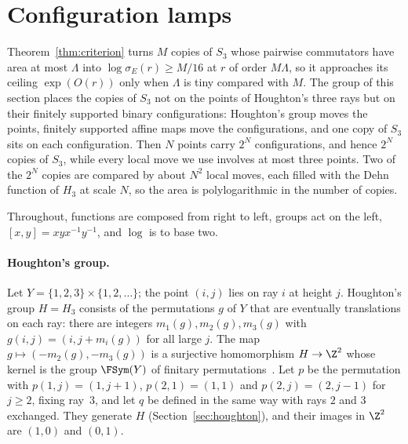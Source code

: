 \section{Configuration lamps}\label{sec:group}

Theorem~\ref{thm:criterion} turns $M$ copies of $S_3$ whose pairwise commutators have area at most $\Lambda$ into $\log\sigma_E(r)\ge M/16$ at
$r$ of order $M\Lambda$, so it approaches its ceiling $\exp(O(r))$ only when $\Lambda$ is tiny compared with $M$. The group of this section places
the copies of $S_3$ not on the points of Houghton's three rays but on their finitely supported binary configurations: Houghton's group moves the
points, finitely supported affine maps move the configurations, and one copy of $S_3$ sits on each configuration. Then $N$ points carry $2^N$
configurations, and hence $2^N$ copies of $S_3$, while every local move we use involves at most three points. Two of the $2^N$ copies are
compared by about $N^2$ local moves, each filled with the Dehn function of $H_3$ at scale $N$, so the area is polylogarithmic in the number of
copies.

Throughout, functions are composed from right to left, groups act on the left, $[x,y]=xyx^{-1}y^{-1}$, and $\log$ is to base two.

\paragraph{Houghton's group.} Let $Y=\{1,2,3\}\times\{1,2,\dots\}$; the point $(i,j)$ lies on ray $i$ at height $j$. Houghton's group
$H=H_3$ consists of the permutations $g$ of $Y$ that are eventually translations on each ray: there are integers $m_1(g),m_2(g),m_3(g)$ with
$g(i,j)=(i,j+m_i(g))$ for all large $j$. The map $g\mapsto(-m_2(g),-m_3(g))$ is a surjective homomorphism $H\to\Z^2$ whose kernel is the group
$\FSym(Y)$ of finitary permutations~\cite{Houghton1978}. Let $p$ be the permutation with $p(1,j)=(1,j+1)$, $p(2,1)=(1,1)$ and
$p(2,j)=(2,j-1)$ for $j\ge2$, fixing ray~$3$, and let $q$ be defined in the same way with rays $2$ and $3$ exchanged. They generate $H$
(Section~\ref{sec:houghton}), and their images in $\Z^2$ are $(1,0)$ and $(0,1)$.

